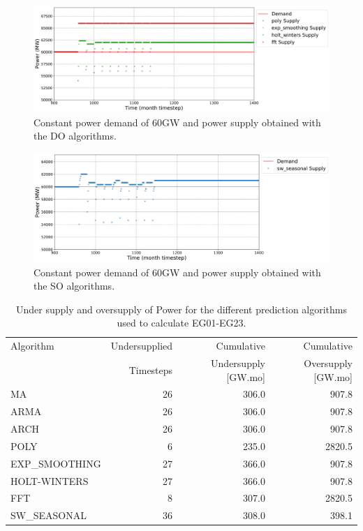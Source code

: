 \documentclass[11pt]{article}
\begin{document}
\begin{figure}[H]
	\centering
	\includegraphics[width=\textwidth]{23-figures/23-power0-buffer02.png} 
	\hfill
	\caption{Constant power demand of 60GW and power supply obtained with the DO algorithms.}
	\label{fig:23-DO}
\end{figure}

\begin{figure}[H]
	\centering
	\includegraphics[width=\textwidth]{23-figures/23-power0-buffer03.png} 
	\hfill
	\caption{Constant power demand of 60GW and power supply obtained with the SO algorithms.}
	\label{fig:23-SO}
\end{figure}

\begin{table}[H]
	\centering
	\caption{Under supply and oversupply of Power for the different prediction algorithms used to calculate EG01-EG23.}
	\label{tab:23-power}
	\begin{tabularx}{\textwidth}{lRRR}
		\hline
		Algorithm & Undersupplied & Cumulative  & Cumulative \\
		& Timesteps     & Undersupply [GW.mo]  & Oversupply [GW.mo] \\ \hline
		MA        & 26 	& 306.0 &  907.8   \\ 
		ARMA      & 26 	& 306.0 &  907.8   \\ 
		ARCH      & 26 	& 306.0 &  907.8   \\ 
		POLY      &  6 	& 235.0 &  2820.5  \\ 
		EXP\_SMOOTHING 	& 27 & 366.0 & 907.8 \\ 
		HOLT-WINTERS  	& 27 & 366.0 & 907.8 \\ 
		FFT       & 8	& 307.0	& 2820.5 \\ 
		SW\_SEASONAL    & 36 & 308.0 & 398.1	\\ \hline
	\end{tabularx}
\end{table}
\end{document}
